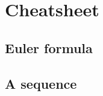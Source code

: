 \chapter{Cheatsheet}
\label{ch:cheatsheet}


\section{Euler formula}
\label{sec:euler-formula}



\section{A sequence}
\label{sec:a-sequence}



